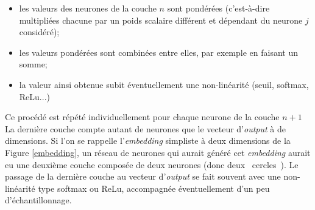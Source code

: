 \documentclass{article}
\begin{document}
					\vspace{2mm}
					\begin{itemize}
						\item les valeurs des neurones de la couche $n$ sont pondérées (c'est-à-dire multipliées chacune par un poids scalaire différent et dépendant du neurone $j$ considéré);
						\item les valeurs pondérées sont combinées entre elles, par exemple en faisant un somme;
						\item la valeur ainsi obtenue subit éventuellement une non-linéarité (seuil, softmax, ReLu...)
					\end{itemize}
					\vspace{2mm}
					Ce procédé est répété individuellement pour chaque neurone de la couche $n+1$\\
					La dernière couche compte autant de neurones que le vecteur d'\textit{output} à de dimensions. Si l'on se rappelle l'\textit{embedding} simpliste à deux dimensions de la Figure \ref{embedding}, un réseau de neurones qui aurait généré cet \textit{embedding} aurait eu une deuxième couche composée de deux neurones (donc deux \guillemotleft~cercles~\guillemotright). Le passage de la dernière couche au vecteur d'\textit{output} se fait souvent avec une non-linéarité type softmax ou ReLu, accompagnée éventuellement d'un peu d'échantillonnage.\\
					
\end{document}
